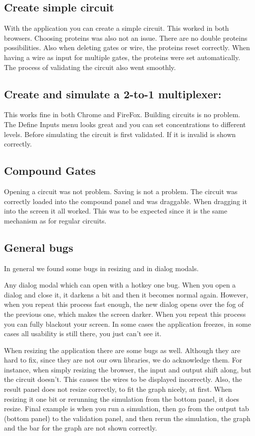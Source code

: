 \documentclass{article}
\begin{document}
\subsection{Create simple circuit}
With the application you can create a simple circuit. This worked in both browsers. Choosing proteins was also not an issue. There are no double proteins possibilities. Also when deleting gates or wire, the proteins reset correctly. When having a wire as input for multiple gates, the proteins were set automatically. The process of validating the circuit also went smoothly.

\subsection{Create and simulate a 2-to-1 multiplexer:}
This works fine in both Chrome and FireFox. Building circuits is no problem. The Define Inputs menu looks great and you can set concentrations to different levels. Before simulating the circuit is first validated. If it is invalid is shown correctly.

\subsection{Compound Gates}
Opening a circuit was not problem. Saving is not a problem. The circuit was correctly loaded into the compound panel and was draggable.
When dragging it into the screen it all worked. This was to be expected since it is the same mechanism as for regular circuits.

\subsection{General bugs}
In general we found some bugs in resizing and in dialog modals.

Any dialog modal which can open with a hotkey one bug. When you open a dialog and close it, it darkens a bit and then it becomes normal again. However, when you repeat this process fast enough, the new dialog opens over the fog of the previous one, which makes the screen darker. When you repeat this process you can fully blackout your screen. In some cases the application freezes, in some cases all usability is still there, you just can't see it.

When resizing the application there are some bugs as well. Although they are hard to fix, since they are not our own libraries, we do acknowledge them.
For instance, when simply resizing the browser, the input and output shift along, but the circuit doesn't. This causes the wires to be displayed incorrectly. Also, the result panel does not resize correctly, to fit the graph nicely, at first. When resizing it one bit or rerunning the simulation from the bottom panel, it does resize.
Final example is when you run a simulation, then go from the output tab (bottom panel) to the validation panel, and then rerun the simulation, the graph and the bar for the graph are not shown correctly.
\end{document}
